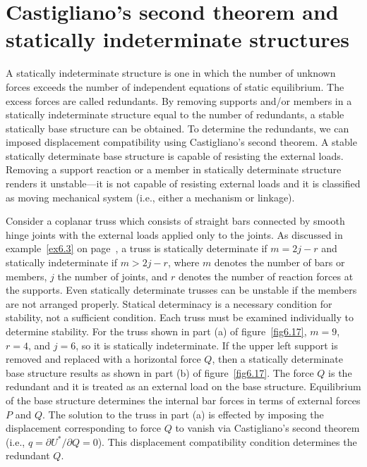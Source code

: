 \documentclass{AeroStructure-ERJohnson}
\begin{document}
\section{Castigliano's second theorem and statically indeterminate structures}\label{sec6.4}

A statically indeterminate structure is one in which the number of unknown forces exceeds the number of independent equations of static equilibrium. The excess forces are called redundants. By removing supports and/or members in a statically indeterminate structure equal to the number of redundants, a stable statically base structure can be obtained. To determine the redundants, we can imposed displacement compatibility using Castigliano's second theorem. A stable statically determinate base structure is capable of resisting the external loads. Removing a support reaction or a member in statically determinate structure renders it unstable---it is not capable of resisting external loads and it is classified as moving mechanical system (i.e., either a mechanism or linkage).

Consider a coplanar truss which consists of straight bars connected by smooth hinge joints with the external loads applied only to the joints. As discussed in example~\ref{ex6.3} on page~\pageref{ex6.3}, a truss is statically determinate if $m=2 j-r$ and statically indeterminate if $m>2 j-r$, where $m$ denotes the number of bars or members, $j$ the number of joints, and $r$ denotes the number of reaction forces at the supports. Even statically determinate trusses can be unstable if the members are not arranged properly. Statical determinacy is a necessary condition for stability, not a sufficient condition. Each truss must be examined individually to determine stability. For the truss shown in part (a) of figure~\ref{fig6.17}, $m = 9$, $r = 4$, and $j= 6$, so it is statically indeterminate. If the upper left support is removed and replaced with a horizontal force $Q$, then a statically determinate base structure results as shown in part (b) of figure~\ref{fig6.17}. The force $Q$ is the redundant and it is treated as an external load on the base structure. Equilibrium of the base structure determines the internal bar forces in terms of external forces $P$ and $Q$. The solution to the truss in part (a) is effected by imposing the displacement corresponding to force $Q$ to vanish via Castigliano's second theorem (i.e., $q=\partial U^{*} / \partial Q=0$). This displacement compatibility condition determines the redundant $Q$.
\end{document}
